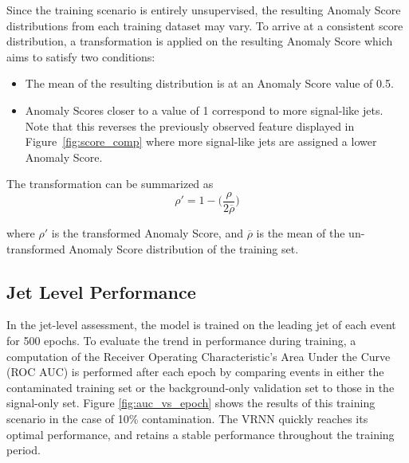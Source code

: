 \documentclass[12pt, a4paper]{article}
\begin{document}
Since the training scenario is entirely unsupervised, the resulting Anomaly Score distributions from each training dataset may vary. To arrive at a consistent score distribution, a transformation is applied on the resulting Anomaly Score which aims to satisfy two conditions:
\begin{itemize}
	\item{The mean of the resulting distribution is at an Anomaly Score value of 0.5.}
	\item{Anomaly Scores closer to a value of 1 correspond to more signal-like jets. Note that this reverses the previously observed feature displayed in Figure~\ref{fig:score_comp} where more signal-like jets are assigned a lower Anomaly Score.}
\end{itemize}

The transformation can be summarized as
\begin{equation}
	\rho ' = 1 - \bigg(\frac{\rho}{2\overline{\rho}}\bigg)
\end{equation}

where $\rho '$ is the transformed Anomaly Score, and  $\overline{\rho}$ is the mean of the un-transformed Anomaly Score distribution of the training set.


\subsection{Jet Level Performance}


In the jet-level assessment, the model is trained on the leading jet of each event for 500 epochs. To evaluate the trend in performance during training, a computation of the Receiver Operating Characteristic's Area Under the Curve (ROC AUC) is performed after each epoch by comparing events in either the contaminated training set or the background-only validation set to those in the signal-only set. Figure \ref{fig:auc_vs_epoch} shows the results of this training scenario in the case of 10\% contamination. The VRNN quickly reaches its optimal performance, and retains a stable performance throughout the training period. 
\end{document}
